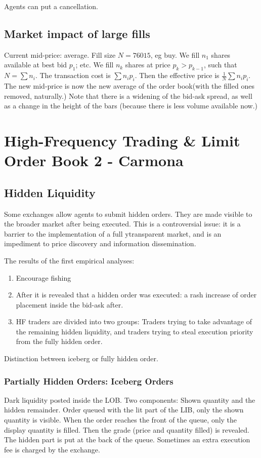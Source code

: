 Agents can put a cancellation.

\section{Market impact of large fills}
Current mid-price: average.
Fill size $N=76015$, eg buy. 
We fill $n_1$ shares available at best bid $p_1$; etc.
We fill $n_k$ shares at price $p_k>p_{k-1}$, such that $N=\sum n_i$. 
The transaction cost is $\sum n_ip_i$. 
Then the effective price is $\frac{1}{N}\sum n_ip_i$. 
The new mid-price is now the new average of the order book(with the filled ones removed, naturally.)
Note that there is a widening of the bid-ask spread, as well as a change in the height of the bars (because there is less volume available now.)


\chapter{High-Frequency Trading \& Limit Order Book 2 - Carmona}
\section{Hidden Liquidity}
Some exchanges allow agents to submit hidden orders. They are made visible to the broader market after being executed.
This is a controversial issue: it is a barrier to the implementation of a full ytransparent market, and is an impediment to price discovery and information dissemination.

The results of the first empirical analyses:
\begin{enumerate}
	\item Encourage fishing
	\item After it is revealed that a hidden order was executed: a rash increase of order placement inside the bid-ask after.
	\item HF traders are divided into two groups: Traders trying to take advantage of the remaining hidden liquidity, and traders trying to steal execution priority from the fully hidden order.
\end{enumerate}

Distinction between iceberg or fully hidden order.

\subsection{Partially Hidden Orders: Iceberg Orders}
Dark liquidity posted inside the LOB. 
Two components: Shown quantity and the hidden remainder. 
Order queued with the lit part of the LIB, only the shown quantity is visible.
 When the order reaches the front of the queue, only the display quantity is filled.
Then the grade (price and quantity filled) is revealed.
The hidden part is put at the back of the queue. 
Sometimes an extra execution fee is charged by the exchange.

